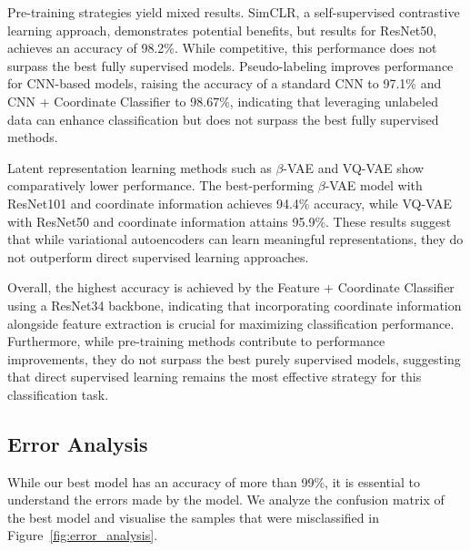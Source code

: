\documentclass{article}
\begin{document}
Pre-training strategies yield mixed results. SimCLR, a self-supervised
contrastive learning approach, demonstrates potential benefits, but results for ResNet50,  achieves an accuracy of 98.2\%. While
competitive, this performance does not surpass the best fully supervised
models. Pseudo-labeling improves performance for CNN-based models, raising the
accuracy of a standard CNN to 97.1\% and CNN + Coordinate Classifier to
98.67\%, indicating that leveraging unlabeled data can enhance classification
but does not surpass the best fully supervised methods.

Latent representation learning methods such as $\beta$-VAE and VQ-VAE show
comparatively lower performance. The best-performing $\beta$-VAE model with
ResNet101 and coordinate information achieves 94.4\% accuracy, while VQ-VAE with
ResNet50 and coordinate information attains 95.9\%. These results suggest that
while variational autoencoders can learn meaningful representations, they do
not outperform direct supervised learning approaches.

Overall, the highest accuracy is achieved by the Feature + Coordinate
Classifier using a ResNet34 backbone, indicating that incorporating coordinate
information alongside feature extraction is crucial for maximizing
classification performance. Furthermore, while pre-training methods contribute
to performance improvements, they do not surpass the best purely supervised
models, suggesting that direct supervised learning remains the most effective
strategy for this classification task.

\subsection{Error Analysis}

While our best model has an accuracy of more than 99\%, it is essential to
understand the errors made by the model. We analyze the confusion matrix of the
best model and visualise the samples that were misclassified in
Figure~\ref{fig:error_analysis}.
\end{document}
